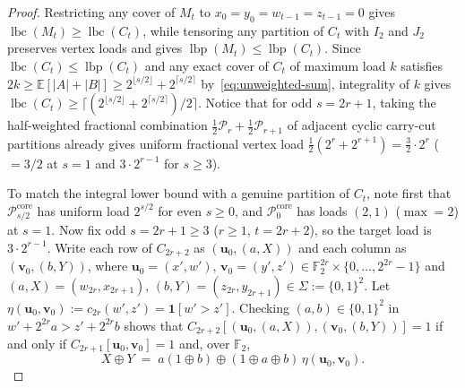 \documentclass[11pt,reqno]{amsart}
\theoremstyle{definition}
\theoremstyle{remark}
\DeclareMathOperator{\lbc}{lbc}
\DeclareMathOperator{\lbp}{lbp}
\newcommand{\FF}{\mathbb{F}}
\newcommand{\EE}{\mathbb{E}}
\newcommand{\ind}{\mathbf{1}}
\numberwithin{equation}{section}
\begin{document}
\begin{proof}
Restricting any cover of $M_t$ to $x_0 = y_0 = w_{t-1} = z_{t-1} = 0$ gives $\lbc(M_t) \ge \lbc(C_t)$, while tensoring any partition of $C_t$ with $I_2$ and $J_2$ preserves vertex loads and gives $\lbp(M_t) \le \lbp(C_t)$. Since $\lbc(C_t) \le \lbp(C_t)$ and any exact cover of $C_t$ of maximum load $k$ satisfies $2k \ge \EE[|A| + |B|] \ge 2^{\lfloor s/2 \rfloor} + 2^{\lceil s/2 \rceil}$ by~\eqref{eq:unweighted-sum}, integrality of $k$ gives $\lbc(C_t) \ge \lceil(2^{\lfloor s/2 \rfloor} + 2^{\lceil s/2 \rceil})/2\rceil$. Notice that for odd $s = 2r + 1$, taking the half-weighted fractional combination $\frac{1}{2}\mathcal{P}_r + \frac{1}{2}\mathcal{P}_{r+1}$ of adjacent cyclic carry-cut partitions already gives uniform fractional vertex load $\frac{1}{2}(2^r + 2^{r+1}) = \frac{3}{2}\cdot 2^r$ ($= 3/2$ at $s = 1$ and $3 \cdot 2^{r-1}$ for $s \ge 3$).

To match the integral lower bound with a genuine partition of $C_t$, note first that $\mathcal{P}_{s/2}^{\mathrm{core}}$ has uniform load $2^{s/2}$ for even $s \ge 0$, and $\mathcal{P}_0^{\mathrm{core}}$ has loads $(2, 1)$ ($\max = 2$) at $s = 1$. Now fix odd $s = 2r + 1 \ge 3$ ($r \ge 1$, $t = 2r + 2$), so the target load is $3 \cdot 2^{r-1}$. Write each row of $C_{2r+2}$ as $(\mathbf{u}_0, (a, X))$ and each column as $(\mathbf{v}_0, (b, Y))$, where $\mathbf{u}_0 = (x', w'),\, \mathbf{v}_0 = (y', z') \in \FF_2^{2r} \times \{0, \dots, 2^{2r}-1\}$ and $(a, X) = (w_{2r}, x_{2r+1}),\, (b, Y) = (z_{2r}, y_{2r+1}) \in \Sigma := \{0, 1\}^2$. Let $\eta(\mathbf{u}_0, \mathbf{v}_0) := c_{2r}(w', z') = \ind[w' > z']$. Checking $(a, b) \in \{0, 1\}^2$ in $w' + 2^{2r}a > z' + 2^{2r}b$ shows that $C_{2r+2}[(\mathbf{u}_0, (a, X)), (\mathbf{v}_0, (b, Y))] = 1$ if and only if $C_{2r+1}[\mathbf{u}_0, \mathbf{v}_0] = 1$ and, over $\FF_2$,
\begin{equation}
  \label{eq:top-carry-eq}
  X \oplus Y \;=\; a(1 \oplus b) \oplus (1 \oplus a \oplus b)\,\eta(\mathbf{u}_0, \mathbf{v}_0).
\end{equation}


\end{proof}
\end{document}

